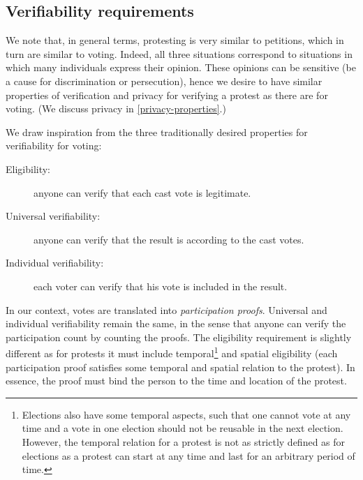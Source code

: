 \subsection{Verifiability requirements}%
\label{verifiability-properties}

We note that, in general terms, protesting is very similar to petitions, which in turn are similar to voting.
Indeed, all three situations correspond to situations in which many individuals express their opinion.
These opinions can be sensitive (\eg be a cause for discrimination or persecution), hence we desire to have similar properties of verification and privacy for verifying a protest as there are for voting.
(We discuss privacy in \cref{privacy-properties}.)

We draw inspiration from the three traditionally desired properties for verifiability for voting:
\begin{description}
  \item[Eligibility:] anyone can verify that each cast vote is legitimate.
  \item[Universal verifiability:] anyone can verify that the result is according to the cast votes.
  \item[Individual verifiability:] each voter can verify that his vote is included in the result.
\end{description}
In our context, votes are translated into \emph{participation proofs}.
Universal and individual verifiability remain the same, in the sense that anyone can verify the participation count by counting the proofs.
The eligibility requirement is slightly different as for protests it must 
include temporal\footnote{%
  Elections also have some temporal aspects, such that one cannot vote at any 
  time and a vote in one election should not be reusable in the next election.
  However, the temporal relation for a protest is not as strictly defined as for 
  elections as a protest can start at any time and last for an arbitrary period 
  of time.%
}
and spatial eligibility (\ie each participation proof satisfies some temporal and spatial relation to the protest).
In essence, the proof must bind the person to the time and location of the protest.

